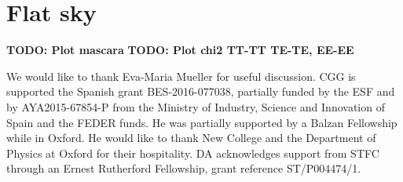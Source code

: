 \documentclass[a4paper,11pt]{article}
\newcommand{\todo}[1]{{\bf TODO: #1}}
\begin{document}
\appendix
\section{Flat sky}
\todo{Plot mascara}
\todo{Plot chi2 TT-TT TE-TE, EE-EE}

\acknowledgments

We would like to thank Eva-Maria Mueller for useful discussion. CGG is
supported the Spanish grant BES-2016-077038, partially funded by the ESF and by
AYA2015-67854-P from the Ministry of Industry, Science and Innovation of Spain
and the FEDER funds. He was partially supported by a Balzan Fellowship while
in Oxford. He would like to thank New College and the Department of Physics at
Oxford for their hospitality. DA acknowledges support from STFC through an
Ernest Rutherford Fellowship, grant reference ST/P004474/1.

\appendix



\end{document}
